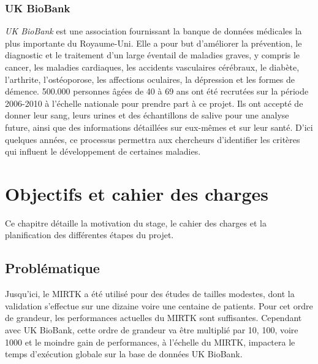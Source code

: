 \documentclass[10pt]{report}
\begin{document}
	 \subsection{UK BioBank}

	 \textit{UK BioBank} est une association fournissant la banque de données médicales la plus importante du Royaume-Uni. Elle a pour but d'améliorer la prévention, le diagnostic et le traitement d'un large éventail de maladies graves, y compris le cancer, les maladies cardiaques, les accidents vasculaires cérébraux, le diabète, l'arthrite, l'ostéoporose, les affections oculaires, la dépression et les formes de démence. 500.000 personnes âgées de 40 à 69 ans ont été recrutées sur la période 2006-2010 à l'échelle nationale pour prendre part à ce projet. Ils ont accepté de donner leur sang, leurs urines et des échantillons de salive pour une analyse future, ainsi que des informations détaillées sur eux-mêmes et sur leur santé. D'ici quelques années, ce processus permettra aux chercheurs d'identifier les critères qui influent le développement de certaines maladies.
	 	 
\chapter{Objectifs et cahier des charges}
	Ce chapitre détaille la motivation du stage, le cahier des charges et la planification des différentes étapes du projet.
	\section{Problématique} 
	Jusqu'ici, le MIRTK a été utilisé pour des études de tailles modestes, dont la validation s'effectue sur une dizaine voire une centaine de patients. Pour cet ordre de grandeur, les performances actuelles du MIRTK sont suffisantes. Cependant avec UK BioBank, cette ordre de grandeur va être multiplié par 10, 100, voire 1000 et le moindre gain de performances, à l'échelle du MIRTK, impactera le temps d'exécution globale sur la base de données UK BioBank.\\ ~\par
	
\end{document}
